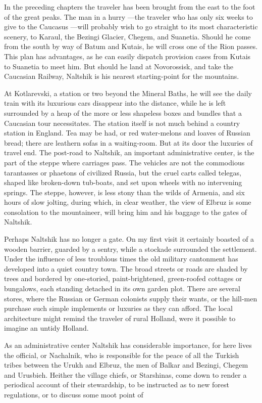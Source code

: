 \documentclass{article}
\begin{document}
	In the preceding chapters the traveler has been brought from the east to the foot of the great peaks. The man in a hurry —the traveler who has only six weeks to give to the Caucasus —will probably wish to go straight to its most characteristic scenery, to Karaul, the Bezingi Glacier, Chegem, and Suanetia. Should he come from the south by way of Batum and Kutais, he will cross one of the Rion passes. This plan has advantages, as he can easily dispatch provision cases from Kutais to Suanetia to meet him. But should he land at Novorossisk, and take the Caucasian Railway, Naltshik is his nearest starting-point for the mountains.
	
	At Kotlarevski, a station or two beyond the Mineral Baths, he will see the daily train with its luxurious cars disappear into the distance, while he is left surrounded by a heap of the more or less shapeless boxes and bundles that a Caucasian tour necessitates. The station itself is not much behind a country station in England. Tea may be had, or red water-melons and loaves of Russian bread; there are leathern sofas in a waiting-room. But at its door the luxuries of travel end. The post-road to Naltshik, an important administrative center, is the part of the steppe where carriages pass. The vehicles are not the commodious tarantasses or phaetons of civilized Russia, but the cruel carts called telegas, shaped like broken-down tub-boats, and set upon wheels with no intervening springs. The steppe, however, is less stony than the wilds of Armenia, and six hours of slow jolting, during which, in clear weather, the view of Elbruz is some consolation to the mountaineer, will bring him and his baggage to the gates of Naltshik.
	
	Perhaps Naltshik has no longer a gate. On my first visit it certainly boasted of a wooden barrier, guarded by a sentry, while a stockade surrounded the settlement. Under the influence of less troublous times the old military cantonment has developed into a quiet country town. The broad streets or roads are shaded by trees and bordered by one-storied, paint-brightened, green-roofed cottages or bungalows, each standing detached in its own garden plot. There are several stores, where the Russian or German colonists supply their wants, or the hill-men purchase such simple implements or luxuries as they can afford. The local architecture might remind the traveler of rural Holland, were it possible to imagine an untidy Holland.
	
	As an administrative center Naltshik has considerable importance, for here lives the official, or Nachalnik, who is responsible for the peace of all the Turkish tribes between the Urukh and Elbruz, the men of Balkar and Bezingi, Chegem and Urusbieh. Heither the village chiefs, or Starshinas, come down to render a periodical account of their stewardship, to be instructed as to new forest regulations, or to discuss some moot point of
	
\end{document}
